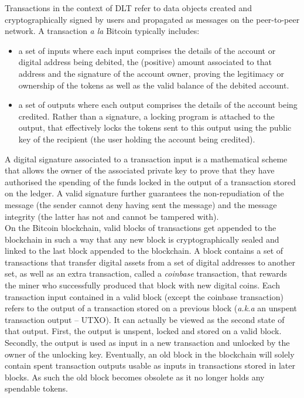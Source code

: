 Transactions in the context of DLT refer to data objects created and cryptographically signed by users and propagated as messages on the peer-to-peer network. A transaction \textit{a la} Bitcoin typically includes:

\begin{itemize}
\item a set of inputs where each input comprises the details of the account or digital address being debited, the (positive) amount associated to that address and the signature of the account owner, proving the legitimacy or ownership of the tokens as well as the valid balance of the debited account. 
\item a set of outputs where each output comprises the details of the account being credited. Rather than a signature, a locking program is attached to the output, that effectively locks the tokens sent to this output using the public key of the recipient (the user holding the account being credited).
\end{itemize}

A digital signature associated to a transaction input is a mathematical scheme that allows the owner of the associated private key to prove that they have authorised the spending of the funds locked in the output of a transaction stored on the ledger. A valid signature further guarantees the non-repudiation of the message (the sender cannot deny having sent the message) and the message integrity (the latter has not and cannot be tampered with). \\

On the Bitcoin blockchain, valid blocks of transactions get appended to the blockchain in such a way that any new block is cryptographically sealed and linked to the last block appended to the blockchain. A block contains a set of transactions that transfer digital assets from a set of digital addresses to another set, as well as an extra transaction, called a \textit{coinbase} transaction, that rewards the miner who successfully produced that block with new digital coins. Each transaction input contained in a valid block (except the coinbase transaction) refers to the output of a transaction stored on a previous block (\textit{a.k.a} an unspent transaction output – UTXO). It can actually be viewed as the second state of that output. First, the output is unspent, locked and stored on a valid block. Secondly, the output is used as input in a new transaction and unlocked by the owner of the unlocking key. Eventually, an old block in the blockchain will solely contain spent transaction outputs usable as inputs in transactions stored in later blocks. As such the old block becomes obsolete as it no longer holds any spendable tokens. \\

